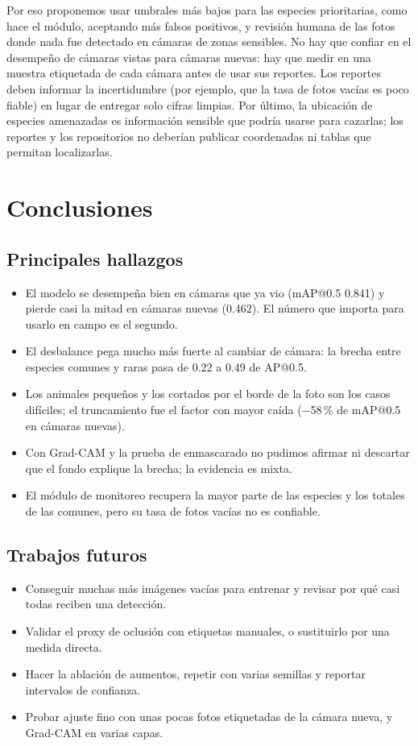 \documentclass[10pt,letterpaper]{article}
\begin{document}
Por eso proponemos usar umbrales más bajos para las especies prioritarias, como hace el módulo, aceptando más falsos positivos, y revisión humana de las fotos donde nada fue detectado en cámaras de zonas sensibles. No hay que confiar en
el desempeño de cámaras vistas para cámaras nuevas: hay que medir en una muestra etiquetada de cada cámara antes de usar sus reportes. Los reportes deben informar la incertidumbre (por ejemplo, que la tasa de fotos vacías es poco fiable)
en lugar de entregar solo cifras limpias. Por último, la ubicación de especies amenazadas es información sensible que podría usarse para cazarlas; los reportes y los repositorios no deberían publicar coordenadas ni tablas que permitan localizarlas.

\section{Conclusiones}
\subsection{Principales hallazgos}
\begin{itemize}
  \item El modelo se desempeña bien en cámaras que ya vio (mAP@0.5 0.841) y pierde casi la mitad en cámaras nuevas (0.462). El número que importa para usarlo en campo es el segundo.
  \item El desbalance pega mucho más fuerte al cambiar de cámara: la brecha entre especies comunes y raras pasa de 0.22 a 0.49 de AP@0.5.
  \item Los animales pequeños y los cortados por el borde de la foto son los casos difíciles; el truncamiento fue el factor con mayor caída ($-$58\,\% de mAP@0.5 en cámaras nuevas).
  \item Con Grad-CAM y la prueba de enmascarado no pudimos afirmar ni descartar que el fondo explique la brecha; la evidencia es mixta.
  \item El módulo de monitoreo recupera la mayor parte de las especies y los totales de las comunes, pero su tasa de fotos vacías no es confiable.
\end{itemize}

\subsection{Trabajos futuros}
\begin{itemize}
  \item Conseguir muchas más imágenes vacías para entrenar y revisar por qué casi todas reciben una detección.
  \item Validar el proxy de oclusión con etiquetas manuales, o sustituirlo por una medida directa.
  \item Hacer la ablación de aumentos, repetir con varias semillas y reportar intervalos de confianza.
  \item Probar ajuste fino con unas pocas fotos etiquetadas de la cámara nueva, y Grad-CAM en varias capas.
\end{itemize}
\end{document}
